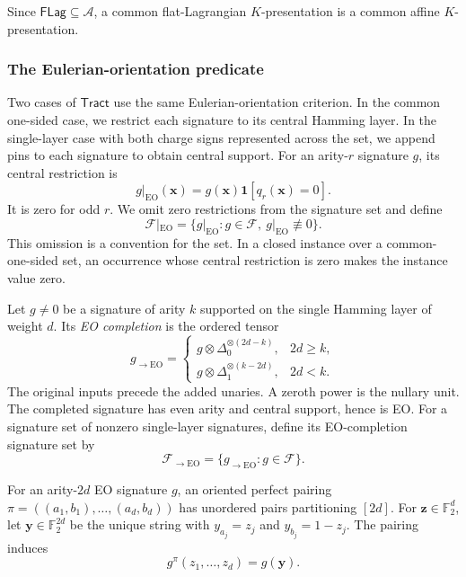 \documentclass[11pt,letterpaper,onecolumn]{article}
\theoremstyle{plain}
\theoremstyle{definition}
\theoremstyle{remark}
\newcommand{\Ftwo}{\mathbb F_2}
\newcommand{\cF}{\mathcal F}
\newcommand{\cA}{\mathscr A}
\newcommand{\Tract}{\mathsf{Tract}}
\newcommand{\FLag}{\mathsf{FLag}}
\newcommand{\EO}{\mathrm{EO}}
\newcommand{\one}{\mathbf 1}
\newcommand{\DeltaZero}{\Delta_0}
\newcommand{\DeltaOne}{\Delta_1}
\begin{document}
Since \(\FLag\subseteq\cA\), a common flat-Lagrangian
\(K\)-presentation is a common affine \(K\)-presentation.

\subsubsection{The Eulerian-orientation predicate}
\label{subsec:eo-predicate}

Two cases of \(\Tract\) use the same Eulerian-orientation criterion.
In the common one-sided case, we restrict each signature to its central
Hamming layer. In the single-layer case with both charge signs represented
across the set, we append pins to each signature to obtain central support. For an arity-\(r\) signature \(g\), its central
restriction is
\begin{equation*}
  g|_{\EO}({\mathbf{x}})=g({\mathbf{x}})\one[q_r({\mathbf{x}})=0].
\end{equation*}
It is zero for odd \(r\). We omit zero restrictions from the signature
set and define
\begin{equation*}
  \cF|_{\EO}=\{g|_{\EO}:g\in\cF,\ g|_{\EO}\not\equiv0\}.
\end{equation*}
This omission is a convention for the set. In a closed instance over a
common-one-sided set, an occurrence whose central restriction is zero
makes the instance value zero.

Let \(g\ne0\) be a signature of arity \(k\) supported on the single Hamming
layer of weight \(d\).  Its \emph{EO completion} \cite[Section~6.2]{MengWangXia2025EO} is the ordered tensor
\begin{equation}
  g_{\to\EO}
  =
  \begin{cases}
    g\otimes\DeltaZero^{\otimes(2d-k)},
      & 2d\ge k,\\
    g\otimes\DeltaOne^{\otimes(k-2d)},
      & 2d<k.
  \end{cases}
  \label{eq:eo-completion}
\end{equation}
The original inputs precede the added unaries. A zeroth power is the nullary
unit.  The completed signature has even arity and central support, hence is
EO\@.  For a signature set of nonzero single-layer signatures, define its
EO-completion signature set by
\begin{equation*}
  \cF_{\to\EO}=\{g_{\to\EO}:g\in\cF\}.
\end{equation*}

For an arity-\(2d\) EO signature \(g\), an oriented perfect pairing
\(\pi=((a_1,b_1),\ldots,(a_d,b_d))\) has unordered pairs partitioning
\([2d]\).  For \({\mathbf{z}}\in\Ftwo^d\), let \({\mathbf{y}}\in\Ftwo^{2d}\) be the unique string
with \(y_{a_j}=z_j\) and \(y_{b_j}=1-z_j\). The pairing induces
\begin{equation*}
  g^\pi(z_1,\ldots,z_d)=g({\mathbf{y}}).
\end{equation*}
\end{document}
